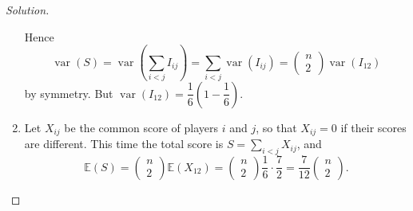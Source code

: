 \documentclass[11pt,singlecolumn, openany, citestyle=authoryear]{elegantbook}
\begin{document}
\begin{CJK}{UTF8}{gbsn}
\begin{proof}[Solution]
\begin{enumerate}
        Hence
        $$
        \operatorname{var}(S)=\operatorname{var}\left(\sum_{i<j} I_{i j}\right)=\sum_{i<j} \operatorname{var}\left(I_{i j}\right)=\left(\begin{array}{l}
        n \\
        2
        \end{array}\right) \operatorname{var}\left(I_{12}\right)
        $$
        by symmetry. But $\operatorname{var}\left(I_{12}\right)=\dfrac{1}{6}\left(1-\dfrac{1}{6}\right)$.
        \item Let $X_{i j}$ be the common score of players $i$ and $j$, so that $X_{i j}=0$ if their scores are different. This time the total score is $S=\sum_{i<j} X_{i j}$, and
        $$
        \mathbb{E}(S)=\left(\begin{array}{l}
        n \\
        2
        \end{array}\right) \mathbb{E}\left(X_{12}\right)=\left(\begin{array}{l}
        n \\
        2
        \end{array}\right) \frac{1}{6} \cdot \frac{7}{2}=\frac{7}{12}\left(\begin{array}{l}
        n \\
        2
        \end{array}\right) .
        $$
        

\end{enumerate}
\end{proof}
\end{CJK}
\end{document}
